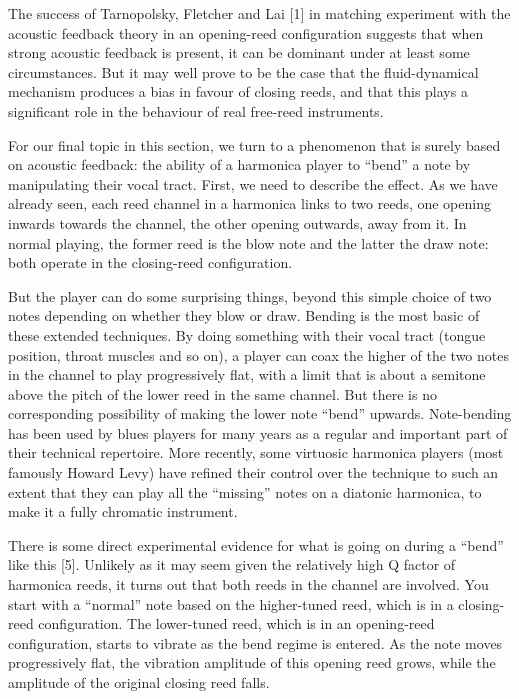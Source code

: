   The success of Tarnopolsky, Fletcher and Lai [1] in matching experiment with 
  the acoustic feedback theory in an opening-reed configuration suggests that 
  when strong acoustic feedback is present, it can be dominant under at least 
  some circumstances. But it may well prove to be the case that the 
  fluid-dynamical mechanism produces a bias in favour of closing reeds, and 
  that this plays a significant role in the behaviour of real free-reed 
  instruments. 

  For our final topic in this section, we turn to a phenomenon that is surely 
  based on acoustic feedback: the ability of a harmonica player to “bend” a 
  note by manipulating their vocal tract. First, we need to describe the 
  effect. As we have already seen, each reed channel in a harmonica links to 
  two reeds, one opening inwards towards the channel, the other opening 
  outwards, away from it. In normal playing, the former reed is the blow note 
  and the latter the draw note: both operate in the closing-reed configuration. 

  But the player can do some surprising things, beyond this simple choice of 
  two notes depending on whether they blow or draw. Bending is the most basic 
  of these extended techniques. By doing something with their vocal tract 
  (tongue position, throat muscles and so on), a player can coax the higher of 
  the two notes in the channel to play progressively flat, with a limit that is 
  about a semitone above the pitch of the lower reed in the same channel. But 
  there is no corresponding possibility of making the lower note “bend” 
  upwards. Note-bending has been used by blues players for many years as a 
  regular and important part of their technical repertoire. More recently, some 
  virtuosic harmonica players (most famously Howard Levy) have refined their 
  control over the technique to such an extent that they can play all the 
  “missing” notes on a diatonic harmonica, to make it a fully chromatic 
  instrument. 

  There is some direct experimental evidence for what is going on during a 
  “bend” like this [5]. Unlikely as it may seem given the relatively high Q 
  factor of harmonica reeds, it turns out that both reeds in the channel are 
  involved. You start with a ``normal'' note based on the higher-tuned reed, 
  which is in a closing-reed configuration. The lower-tuned reed, which is in 
  an opening-reed configuration, starts to vibrate as the bend regime is 
  entered. As the note moves progressively flat, the vibration amplitude of 
  this opening reed grows, while the amplitude of the original closing reed 
  falls. 

